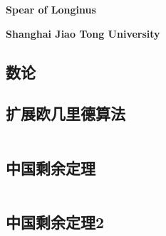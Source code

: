\documentclass[landscape, twoside, a4paper]{article}
\newcommand{\cppcode}[1]{
	\inputminted[mathescape,
	frame=lines,linenos]{cpp}{source/#1}
}
\begin{document}
\scriptsize
	
	\begin{center}
		\textbf{\LARGE{Spear of Longinus}}
		
		
		\textbf{\small{Shanghai Jiao Tong University}}
	\end{center}
	
	\begin{multicols}{2}
		
		\begin{spacing}{0}
			\tableofcontents
		\end{spacing}
		\clearpage
		
		\begin{spacing}{0.8}
			

\section{数论}



\subsection{扩展欧几里德算法}


\cppcode{number-theory/extended-euclid.cpp}


\subsection{中国剩余定理}

\cppcode{number-theory/chinese-remainder-theorem.cpp}


\subsection{中国剩余定理2}

\cppcode{number-theory/china2.cpp}




\end{spacing}
\end{multicols}
\end{document}
